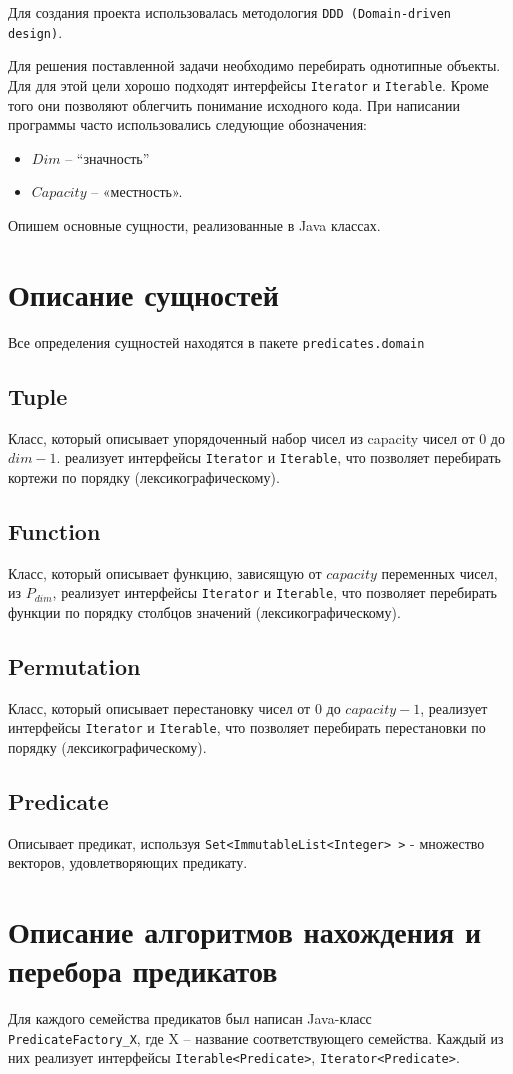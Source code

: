 \documentclass[a4paper,14pt]{extreport}
\begin{document}
Для создания проекта использовалась методология {\tt DDD (Domain-driven design)}. 

Для решения поставленной задачи необходимо перебирать однотипные объекты. Для для этой цели хорошо подходят интерфейсы {\tt Iterator} и {\tt Iterable}. Кроме того они позволяют облегчить понимание исходного кода.
При написании программы часто использовались следующие обозначения:
\begin{itemize}
\item$Dim$ – “значность”
\item$Capacity$ – «местность».  
\end{itemize} 

Опишем основные сущности, реализованные в Java классах.

\section{Описание сущностей}
Все определения сущностей находятся в пакете {\tt predicates.domain}
\subsection{Tuple}
Класс, который описывает упорядоченный набор чисел из capacity чисел от $0$ до $dim-1$. реализует интерфейсы {\tt Iterator} и {\tt Iterable}, что позволяет перебирать кортежи по порядку (лексикографическому).
\subsection{Function}
Класс, который описывает функцию, зависящую от $capacity$ переменных чисел, из $P_{dim}$, реализует интерфейсы {\tt Iterator} и {\tt Iterable}, что позволяет перебирать функции по порядку столбцов значений (лексикографическому).
\subsection{Permutation}
Класс, который описывает перестановку чисел от $0$ до $capacity-1$, реализует интерфейсы {\tt Iterator} и {\tt Iterable}, что позволяет перебирать перестановки по порядку (лексикографическому).
\subsection{Predicate} 
Описывает предикат, используя {\tt Set<ImmutableList<Integer> >} - множество векторов, удовлетворяющих предикату.

\section{Описание алгоритмов нахождения и перебора предикатов}
Для каждого семейства предикатов был написан Java-класс \\{\tt PredicateFactory\_X}, где X – название соответствующего семейства. Каждый из них реализует интерфейсы {\tt Iterable<Predicate>}, {\tt Iterator<Predicate>}.
\end{document}
